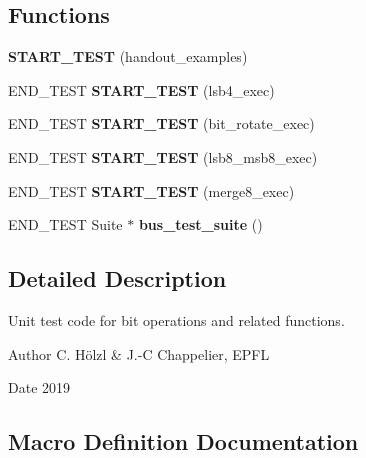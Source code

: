 \subsection*{Functions}
\begin{DoxyCompactItemize}
\item 
\mbox{\label{unit-test-bit_8c_ad51d3a3f0cd5bca7b488da2c5451819f}} 
{\bfseries S\+T\+A\+R\+T\+\_\+\+T\+E\+ST} (handout\+\_\+examples)
\item 
\mbox{\label{unit-test-bit_8c_afa4741df7ac75c78ea8c23ba5b3517e6}} 
E\+N\+D\+\_\+\+T\+E\+ST {\bfseries S\+T\+A\+R\+T\+\_\+\+T\+E\+ST} (lsb4\+\_\+exec)
\item 
\mbox{\label{unit-test-bit_8c_a85c29388c1af6e853f533f9bc1b94386}} 
E\+N\+D\+\_\+\+T\+E\+ST {\bfseries S\+T\+A\+R\+T\+\_\+\+T\+E\+ST} (bit\+\_\+rotate\+\_\+exec)
\item 
\mbox{\label{unit-test-bit_8c_a3665719b0b66911e6fdb244dd1eebf0c}} 
E\+N\+D\+\_\+\+T\+E\+ST {\bfseries S\+T\+A\+R\+T\+\_\+\+T\+E\+ST} (lsb8\+\_\+msb8\+\_\+exec)
\item 
\mbox{\label{unit-test-bit_8c_a81d99faed4f8e7cc0fecda43b1113fd1}} 
E\+N\+D\+\_\+\+T\+E\+ST {\bfseries S\+T\+A\+R\+T\+\_\+\+T\+E\+ST} (merge8\+\_\+exec)
\item 
\mbox{\label{unit-test-bit_8c_a9942b766a70847794d9eba89f6f01b42}} 
E\+N\+D\+\_\+\+T\+E\+ST Suite $\ast$ {\bfseries bus\+\_\+test\+\_\+suite} ()
\end{DoxyCompactItemize}


\subsection{Detailed Description}
Unit test code for bit operations and related functions. 

\begin{DoxyAuthor}{Author}
C. Hölzl \& J.-\/C Chappelier, E\+P\+FL 
\end{DoxyAuthor}
\begin{DoxyDate}{Date}
2019 
\end{DoxyDate}


\subsection{Macro Definition Documentation}
\mbox{\label{unit-test-bit_8c_aacea32bb563e40cc17843f7d5163527b}} 

